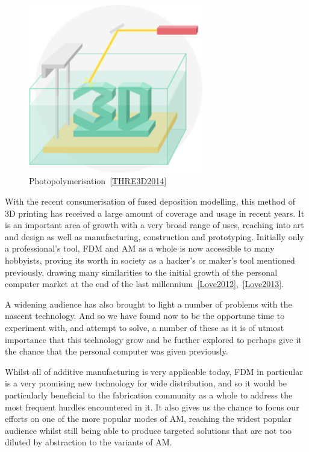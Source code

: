 \documentclass[11pt]{report} %
\begin{document}
\begin{figure}[H]
  \centering
  \includegraphics[width=3in]{sla.png}
  \caption{Photopolymerisation~\ref{THRE3D2014}}
  \label{figure:SLA}
\end{figure}

With the recent consumerisation of fused deposition modelling, this method of 3D printing has received a large amount of coverage and usage in recent years. It is an important area of growth with a very broad range of uses, reaching into art and design as well as manufacturing, construction and prototyping. Initially only a professional's tool, FDM and AM as a whole is now accessible to many hobbyists, proving its worth in society as a hacker's or maker's tool mentioned previously, drawing many similarities to the initial growth of the personal computer market at the end of the last millennium~\ref{Love2012},~\ref{Love2013}.

A widening audience has also brought to light a number of problems with the nascent technology. And so we have found now to be the opportune time to experiment with, and attempt to solve, a number of these as it is of utmost importance that this technology grow and be further explored to perhaps give it the chance that the personal computer was given previously.

Whilst all of additive manufacturing is very applicable today, FDM in particular is a very promising new technology for wide distribution, and so it would be particularly beneficial to the fabrication community as a whole to address the most frequent hurdles encountered in it. It also gives us the chance to focus our efforts on one of the more popular modes of AM, reaching the widest popular audience whilst still being able to produce targeted solutions that are not too diluted by abstraction to the variants of AM.
\end{document}
